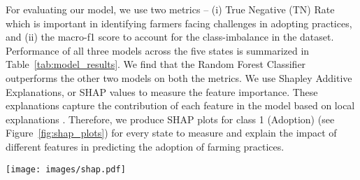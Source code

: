 \documentclass[manuscript,screen]{acmart}
\begin{document}
For evaluating our model, we use two metrics -- (i) True Negative (TN) Rate which is important in identifying farmers facing challenges in adopting practices, and (ii) the macro-f1 score to account for the class-imbalance in the dataset. Performance of all three models across the five states is summarized in Table~\ref{tab:model_results}. We find that the Random Forest Classifier outperforms the other two models on both the metrics. We use Shapley Additive Explanations, or SHAP values \cite{SHAP} to measure the feature importance. These explanations capture the contribution of each feature in the model based on local explanations \cite{SHAPlocal}. Therefore, we produce SHAP plots for  class 1 (Adoption) (see Figure~\ref{fig:shap_plots}) for every state to measure and explain the impact of different features in predicting the adoption of farming practices. 

\begin{figure*}
    \centering
    \texttt{[image: images/shap.pdf]}
    \caption{\textbf{SHAP summary plots for model features for all five states, with features ranked by importance from top to bottom. The x-axis represents the SHAP value for each feature. For e.g., Past Co-Adopter Influence ($PAI$) has high (red) values towards the right, indicating its positive impact on adoption (class 1) as per our model.}}
    \label{fig:shap_plots}
\end{figure*}
\end{document}
